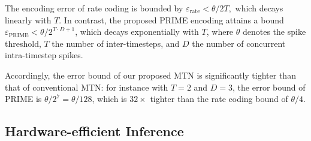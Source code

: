 \begin{proposition}
\label{prop:rmpa-mtn-error-bound}
    The encoding error of rate coding is bounded by
    $\varepsilon_{\text{rate}} < \theta/2T,$
which decays linearly with $T$. In contrast, the proposed PRIME encoding attains a bound $\varepsilon_{\text{PRIME}} < \theta/2^{T \cdot D + 1}$, which decays exponentially with $T$, where $\theta$ denotes the spike threshold, $T$  the number of inter-timesteps, and $D$   the number of concurrent intra-timestep spikes.
\end{proposition}




 Accordingly, the error bound of our proposed MTN is significantly tighter than that of conventional MTN: for instance with $T=2$ and $D=3$, the error bound of PRIME is $\theta / 2^{7} = \theta / 128$, which is $32\times$ tighter than the rate coding bound of $\theta / 4$. 

\subsection{Hardware-efficient Inference}
